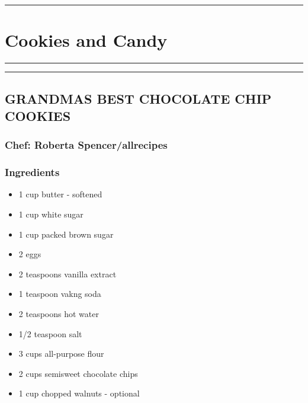 \documentclass[
]{book}
\providecommand{\tightlist}{%
  \setlength{\itemsep}{0pt}\setlength{\parskip}{0pt}}
\begin{document}
\begin{center}\rule{0.5\linewidth}{0.5pt}\end{center}

\hypertarget{Cookies}{%
\chapter{Cookies and Candy}\label{Cookies}}

\begin{center}\rule{0.5\linewidth}{0.5pt}\end{center}

\begin{center}\rule{0.5\linewidth}{0.5pt}\end{center}

\hypertarget{grandmas-best-chocolate-chip-cookies}{%
\section*{GRANDMAS BEST CHOCOLATE CHIP COOKIES}\label{grandmas-best-chocolate-chip-cookies}}


\hypertarget{chef-roberta-spencerallrecipes}{%
\subsection*{Chef: Roberta Spencer/allrecipes}\label{chef-roberta-spencerallrecipes}}


\hypertarget{ingredients-93}{%
\subsection*{Ingredients}\label{ingredients-93}}


\begin{itemize}
\tightlist
\item
  1 cup butter - softened
\item
  1 cup white sugar
\item
  1 cup packed brown sugar
\item
  2 eggs
\item
  2 teaspoons vanilla extract
\item
  1 teaspoon vakng soda
\item
  2 teaspoons hot water
\item
  1/2 teaspoon salt
\item
  3 cups all-purpose flour
\item
  2 cups semisweet chocolate chips
\item
  1 cup chopped walnuts - optional
\end{itemize}
\end{document}
